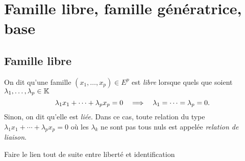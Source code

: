 \documentclass{magnolia}
\begin{document}
\magtoc

\section{Famille libre, famille génératrice, base}
\subsection{Famille libre}

\begin{definition}[utile=-3]
On dit qu'une famille $(x_1,\ldots,x_p)\in E^p$ est \emph{libre} lorsque quels que
soient $\lambda_1,\ldots,\lambda_p\in\mathbb{K}$
\[\lambda_1 x_1+\cdots+\lambda_p x_p=0 \quad\Longrightarrow\quad
  \lambda_1=\cdots=\lambda_p=0.\]
Sinon, on dit qu'elle est \emph{liée}. Dans ce cas, toute relation du type
$\lambda_1 x_1+\cdots+\lambda_p x_p=0$ où les $\lambda_k$ ne sont pas tous nuls
est appelée \emph{relation de liaison}.
\end{definition}

\begin{sol}
Faire le lien tout de suite entre liberté et identification
\end{sol}
\end{document}
